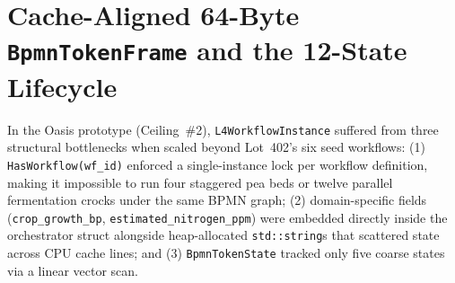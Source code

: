 \begin{table}[htbp]
\centering
\caption{The Two-Zone Metrological Invariant: Layer~6 Human Edge Unit Localization Compiled to Canonical 64-Bit Fixed-Point SI Integers in Layers~2--4 (\texttt{CCI-6}, \texttt{D7}, \texttt{D8})}
\label{tab:ch2-two-zone-localization}
\footnotesize
{}
\end{table}

\section{Cache-Aligned 64-Byte \texttt{BpmnTokenFrame} and the 12-State Lifecycle}
\label{sec:ch2-token-frame}

In the Oasis prototype (Ceiling~\#2), \texttt{L4WorkflowInstance} suffered from three
structural bottlenecks when scaled beyond Lot~402's six seed workflows: (1)
\texttt{HasWorkflow(wf\_id)} enforced a single-instance lock per workflow definition, making
it impossible to run four staggered pea beds or twelve parallel fermentation crocks under
the same BPMN graph; (2) domain-specific fields (\texttt{crop\_growth\_bp},
\texttt{estimated\_nitrogen\_ppm}) were embedded directly inside the orchestrator struct
alongside heap-allocated \texttt{std::string}s that scattered state across CPU cache lines;
and (3) \texttt{BpmnTokenState} tracked only five coarse states via a linear vector scan.


